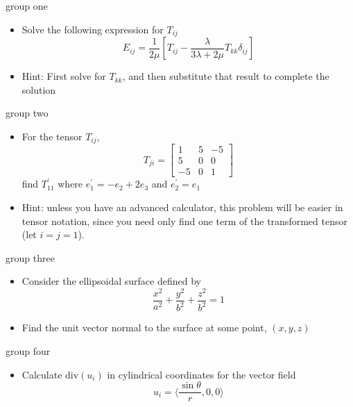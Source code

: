\begin{frame}{group one}
\protect\hypertarget{group-one}{}
\begin{itemize}
\item
  Solve the following expression for \(T_{ij}\)
  \[E_{ij} = \frac{1}{2\mu} \left[T_{ij} - \frac{\lambda}{3\lambda + 2\mu} T_{kk} \delta_{ij}\right]\]
\item
  Hint: First solve for \(T_{kk}\), and then substitute that result to
  complete the solution
\end{itemize}
\end{frame}

\begin{frame}{group two}
\protect\hypertarget{group-two}{}
\begin{itemize}
\item
  For the tensor \(T_{ij}\), \[T_{ji} = \begin{bmatrix}
  1& 5 & -5\\
  5 & 0 & 0\\
    -5 & 0 & 1
  \end{bmatrix}\] find \(T_{11}^\prime\) where
  \(e_1^\prime = -e_2 + 2e_3\) and \(e_2^\prime = e_1\)
\item
  Hint: unless you have an advanced calculator, this problem will be
  easier in tensor notation, since you need only find one term of the
  transformed tensor (let \(i=j=1\)).
\end{itemize}
\end{frame}

\begin{frame}{group three}
\protect\hypertarget{group-three}{}
\begin{itemize}
\item
  Consider the ellipsoidal surface defined by
  \[\frac{x^2}{a^2} + \frac{y^2}{b^2} + \frac{z^2}{b^2} = 1\]
\item
  Find the unit vector normal to the surface at some point, \((x,y,z)\)
\end{itemize}
\end{frame}

\begin{frame}{group four}
\protect\hypertarget{group-four}{}
\begin{itemize}
\tightlist
\item
  Calculate \(\text{div}(u_i)\) in cylindrical coordinates for the
  vector field \[u_i = \langle \frac{\sin \theta}{r}, 0, 0 \rangle\]
\end{itemize}
\end{frame}
